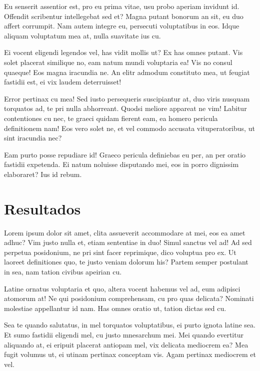 \documentclass[
	12pt,				%
	openright,			%
	oneside,			%
	a4paper,			%
	english,			%
	french,				%
	spanish,			%
	brazil,				%
	]{abntex2}
\begin{document}
Eu senserit assentior est, pro eu prima vitae, usu probo aperiam invidunt id. Offendit scribentur intellegebat sed et? Magna putant bonorum an sit, eu duo affert corrumpit. Nam autem integre eu, persecuti voluptatibus in eos. Idque aliquam voluptatum mea at, nulla suavitate ius cu.

Ei vocent eligendi legendos vel, has vidit mollis ut? Ex has omnes putant. Vis solet placerat similique no, eam natum mundi voluptaria ea! Vis no consul quaeque! Eos magna iracundia ne. An elitr admodum constituto mea, ut feugiat fastidii est, ei vix laudem deterruisset!

Error pertinax cu mea! Sed iusto persequeris suscipiantur at, duo viris nusquam torquatos ad, te pri nulla abhorreant. Quodsi meliore appareat ne vim! Labitur contentiones cu nec, te graeci quidam fierent eam, ea homero pericula definitionem nam! Eos vero solet ne, et vel commodo accusata vituperatoribus, ut sint iracundia nec?

Eam purto posse repudiare id! Graeco pericula definiebas eu per, an per oratio fastidii expetenda. Ei natum noluisse disputando mei, eos in porro dignissim elaboraret? Ius id rebum.


\chapter{Resultados}
\label{ch: resultados} 

Lorem ipsum dolor sit amet, clita assueverit accommodare at mei, eos ea amet adhuc? Vim justo nulla et, etiam sententiae in duo! Simul sanctus vel ad! Ad sed perpetua posidonium, ne pri sint facer reprimique, dico voluptua pro ex. Ut laoreet definitiones quo, te justo veniam dolorum his? Partem semper postulant in sea, nam tation civibus apeirian cu.

Latine ornatus voluptaria et quo, altera vocent habemus vel ad, eum adipisci atomorum at! Ne qui posidonium comprehensam, cu pro quas delicata? Nominati molestiae appellantur id nam. Has omnes oratio ut, tation dictas sed cu.

Sea te quando salutatus, in mel torquatos voluptatibus, ei purto ignota latine sea. Et sumo fastidii eligendi mel, cu justo mnesarchum mei. Mei quando evertitur aliquando at, ei eripuit placerat antiopam mel, vix delicata mediocrem ea? Mea fugit volumus ut, ei utinam pertinax conceptam vis. Agam pertinax mediocrem et vel.
\end{document}
